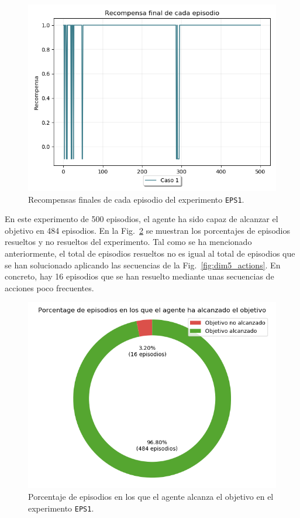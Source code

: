 \begin{figure}
    \centering
    \includegraphics[scale=0.4]{cap5_experimentacion/images/dim5_recompensa.png}
    \caption{Recompensas finales de cada episodio del experimento \texttt{EPS1}.}
    \label{fig:dim5_recompensa}
\end{figure}

En este experimento de 500 episodios, el agente ha sido capaz de alcanzar el objetivo en 484 episodios. En la Fig.~\ref{fig:dim5_porcentajeResuelto} se muestran los porcentajes de episodios resueltos y no resueltos del experimento. Tal como se ha mencionado anteriormente, el total de episodios resueltos no es igual al total de episodios que se han solucionado aplicando las secuencias de la Fig.~\ref{fig:dim5_actions}. En concreto, hay 16  episodios que se han resuelto mediante unas secuencias de acciones poco frecuentes. \\

\begin{figure}
    \centering
    \includegraphics[scale=0.4]{cap5_experimentacion/images/dim5_porcentajeResuelto.png}
    \caption{Porcentaje de episodios en los que el agente alcanza el objetivo en el experimento \texttt{EPS1}.}
    \label{fig:dim5_porcentajeResuelto}
\end{figure}

